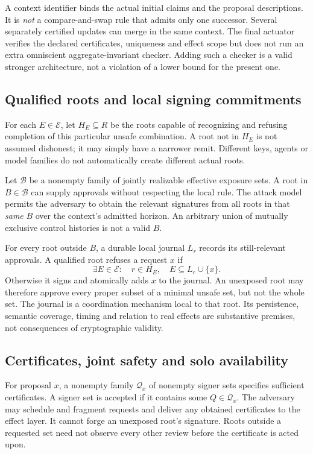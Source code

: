 \documentclass[11pt,a4paper]{article}
\theoremstyle{definition}\newtheorem{definition}{Definition}
\newcommand{\E}{\mathcal E}\newcommand{\B}{\mathcal B}\newcommand{\F}{\mathcal F}\newcommand{\Q}{\mathcal Q}
\begin{document}
A context identifier binds the actual initial claims and the proposal descriptions. It is \emph{not} a compare-and-swap rule that admits only one successor. Several separately certified updates can merge in the same context. The final actuator verifies the declared certificates, uniqueness and effect scope but does not run an extra omniscient aggregate-invariant checker. Adding such a checker is a valid stronger architecture, not a violation of a lower bound for the present one.

\subsection{Qualified roots and local signing commitments}
For each $E\in\E$, let $H_E\subseteq R$ be the roots capable of recognizing and refusing completion of this particular unsafe combination. A root not in $H_E$ is not assumed dishonest; it may simply have a narrower remit. Different keys, agents or model families do not automatically create different actual roots.

Let $\B$ be a nonempty family of jointly realizable effective exposure sets. A root in $B\in\B$ can supply approvals without respecting the local rule. The attack model permits the adversary to obtain the relevant signatures from all roots in that \emph{same} $B$ over the context's admitted horizon. An arbitrary union of mutually exclusive control histories is not a valid $B$.

For every root outside $B$, a durable local journal $L_r$ records its still-relevant approvals. A qualified root refuses a request $x$ if
\begin{equation}
\exists E\in\E:\quad r\in H_E,\quad E\subseteq L_r\cup\{x\}.
\label{eq:local}
\end{equation}
Otherwise it signs and atomically adds $x$ to the journal. An unexposed root may therefore approve every proper subset of a minimal unsafe set, but not the whole set. The journal is a coordination mechanism local to that root. Its persistence, semantic coverage, timing and relation to real effects are substantive premises, not consequences of cryptographic validity.

\subsection{Certificates, joint safety and solo availability}
For proposal $x$, a nonempty family $\Q_x$ of nonempty signer sets specifies sufficient certificates. A signer set is accepted if it contains some $Q\in\Q_x$. The adversary may schedule and fragment requests and deliver any obtained certificates to the effect layer. It cannot forge an unexposed root's signature. Roots outside a requested set need not observe every other review before the certificate is acted upon.
\end{document}
